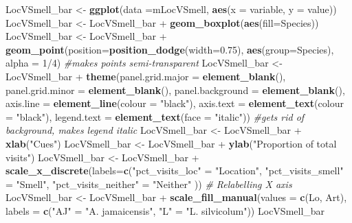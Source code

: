 \documentclass[]{article}
\newenvironment{Shaded}{\begin{snugshade}}{\end{snugshade}}
\newcommand{\KeywordTok}[1]{\textcolor[rgb]{0.13,0.29,0.53}{\textbf{{#1}}}}
\newcommand{\DataTypeTok}[1]{\textcolor[rgb]{0.13,0.29,0.53}{{#1}}}
\newcommand{\DecValTok}[1]{\textcolor[rgb]{0.00,0.00,0.81}{{#1}}}
\newcommand{\FloatTok}[1]{\textcolor[rgb]{0.00,0.00,0.81}{{#1}}}
\newcommand{\StringTok}[1]{\textcolor[rgb]{0.31,0.60,0.02}{{#1}}}
\newcommand{\CommentTok}[1]{\textcolor[rgb]{0.56,0.35,0.01}{\textit{{#1}}}}
\newcommand{\NormalTok}[1]{{#1}}
\begin{document}
\begin{Shaded}
\begin{Highlighting}[]
\NormalTok{LocVSmell_bar <-}\StringTok{ }\KeywordTok{ggplot}\NormalTok{(}\DataTypeTok{data =}\NormalTok{mLocVSmell, }\KeywordTok{aes}\NormalTok{(}\DataTypeTok{x =} \NormalTok{variable, }\DataTypeTok{y =} \NormalTok{value))}
\NormalTok{LocVSmell_bar <-}\StringTok{ }\NormalTok{LocVSmell_bar +}\StringTok{ }\KeywordTok{geom_boxplot}\NormalTok{(}\KeywordTok{aes}\NormalTok{(}\DataTypeTok{fill=}\NormalTok{Species))}
\NormalTok{LocVSmell_bar <-}\StringTok{ }\NormalTok{LocVSmell_bar +}\StringTok{ }\KeywordTok{geom_point}\NormalTok{(}\DataTypeTok{position=}\KeywordTok{position_dodge}\NormalTok{(}\DataTypeTok{width=}\FloatTok{0.75}\NormalTok{), }\KeywordTok{aes}\NormalTok{(}\DataTypeTok{group=}\NormalTok{Species), }\DataTypeTok{alpha =} \DecValTok{1}\NormalTok{/}\DecValTok{4}\NormalTok{) }\CommentTok{#makes points semi-transparent}
\NormalTok{LocVSmell_bar <-}\StringTok{ }\NormalTok{LocVSmell_bar +}\StringTok{ }\KeywordTok{theme}\NormalTok{(}\DataTypeTok{panel.grid.major =} \KeywordTok{element_blank}\NormalTok{(), }\DataTypeTok{panel.grid.minor =} \KeywordTok{element_blank}\NormalTok{(),}
\DataTypeTok{panel.background =} \KeywordTok{element_blank}\NormalTok{(), }\DataTypeTok{axis.line =} \KeywordTok{element_line}\NormalTok{(}\DataTypeTok{colour =} \StringTok{"black"}\NormalTok{), }\DataTypeTok{axis.text =} \KeywordTok{element_text}\NormalTok{(}\DataTypeTok{colour =} \StringTok{"black"}\NormalTok{), }\DataTypeTok{legend.text =} \KeywordTok{element_text}\NormalTok{(}\DataTypeTok{face =} \StringTok{"italic"}\NormalTok{))  }\CommentTok{#gets rid of background, makes legend italic}
\NormalTok{LocVSmell_bar <-}\StringTok{ }\NormalTok{LocVSmell_bar +}\StringTok{ }\KeywordTok{xlab}\NormalTok{(}\StringTok{"Cues"}\NormalTok{)}
\NormalTok{LocVSmell_bar <-}\StringTok{ }\NormalTok{LocVSmell_bar +}\StringTok{ }\KeywordTok{ylab}\NormalTok{(}\StringTok{"Proportion of total visits"}\NormalTok{)}
\NormalTok{LocVSmell_bar <-}\StringTok{ }\NormalTok{LocVSmell_bar +}\StringTok{ }\KeywordTok{scale_x_discrete}\NormalTok{(}\DataTypeTok{labels=}\KeywordTok{c}\NormalTok{(}\StringTok{"pct_visits_loc"} \NormalTok{=}\StringTok{ "Location"}\NormalTok{, }\StringTok{"pct_visits_smell"} \NormalTok{=}\StringTok{ "Smell"}\NormalTok{,}
                              \StringTok{"pct_visits_neither"} \NormalTok{=}\StringTok{ "Neither"} \NormalTok{))  }\CommentTok{# Relabelling X axis}
\NormalTok{LocVSmell_bar <-}\StringTok{ }\NormalTok{LocVSmell_bar +}\StringTok{  }\KeywordTok{scale_fill_manual}\NormalTok{(}\DataTypeTok{values =} \KeywordTok{c}\NormalTok{(Lo, Art), }\DataTypeTok{labels =} \KeywordTok{c}\NormalTok{(}\StringTok{"AJ"} \NormalTok{=}\StringTok{ "A. jamaicensis"}\NormalTok{, }\StringTok{"L"} \NormalTok{=}\StringTok{ "L. silvicolum"}\NormalTok{))}
\NormalTok{LocVSmell_bar}
\end{Highlighting}
\end{Shaded}
\end{document}
